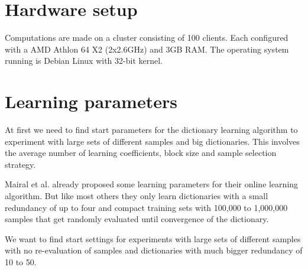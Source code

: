 \section{Hardware setup} 
Computations are made on a cluster consisting of 100 clients. Each 
configured with a AMD Athlon 64 X2 (2x2.6GHz) and 3GB RAM.
The operating system running is Debian Linux with 32-bit kernel. 

\section{Learning parameters}
At first we need to find start parameters for the dictionary learning
algorithm to experiment with large sets of different samples and big
dictionaries. This involves the average number of learning
coefficients, block size and sample selection strategy.

Mairal et al. already proposed some learning parameters for their online
learning algorithm. But like most others they only learn dictionaries with
a small redundancy of up to four and compact training sets with 100,000
to 1,000,000 samples that get randomly evaluated until convergence of the
dictionary.

We want to find start settings for experiments with large sets of
different samples with no re-evaluation of samples and dictionaries
with much bigger redundancy of 10 to 50.


